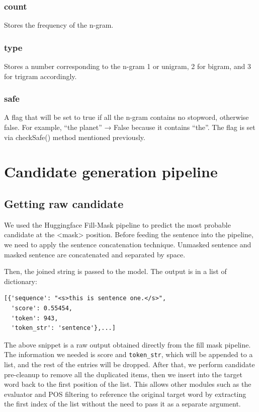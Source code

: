 \documentclass[12pt,oneside,openright,a4paper]{cpe-english-project}
\begin{document}
\subsubsection{count}
Stores the frequency of the n-gram. 

\subsubsection{ type}
Stores a number corresponding to the n-gram 1 or unigram, 2 for bigram, and 3 for trigram accordingly. 

\subsubsection{ safe }
A flag that will be set to true if all the n-gram contains no stopword, otherwise false. For example, “the planet” → False because it contains “the”. The flag is set via checkSafe() method mentioned previously.

\section{Candidate generation pipeline}

\subsection{Getting raw candidate}
We used the Huggingface Fill-Mask pipeline to predict the most probable candidate at the <mask> position. Before feeding the sentence into the pipeline, we need to apply the sentence concatenation technique. Unmasked sentence and masked sentence are concatenated and separated by space. 

Then, the joined string is passed to the model. The output is in a list of dictionary:



\begin{verbatim}
[{'sequence': "<s>this is sentence one.</s>",
  'score': 0.55454,
  'token': 943,
  'token_str': 'sentence'},...]
\end{verbatim}

The above snippet is a raw output obtained directly from the fill mask pipeline. The information we needed is score and \verb/token_str/, which will be appended to a list, and the rest of the entries will be dropped. After that, we perform candidate pre-cleanup to remove all the duplicated items, then we insert into the target word back to the first position of the list. This allows other modules such as the evaluator and POS filtering to reference the original target word by extracting the first index of the list without the need to pass it as a separate argument. 
\end{document}
